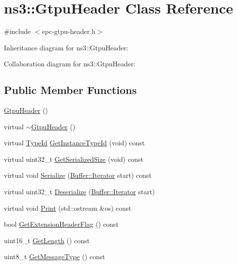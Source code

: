 \hypertarget{classns3_1_1GtpuHeader}{}\section{ns3\+:\+:Gtpu\+Header Class Reference}
\label{classns3_1_1GtpuHeader}


{\ttfamily \#include $<$epc-\/gtpu-\/header.\+h$>$}



Inheritance diagram for ns3\+:\+:Gtpu\+Header\+:


Collaboration diagram for ns3\+:\+:Gtpu\+Header\+:
\subsection*{Public Member Functions}
\begin{DoxyCompactItemize}
\item 
\hyperlink{classns3_1_1GtpuHeader_a6e75cbf6777f9730c92672bdb6f893ee}{Gtpu\+Header} ()
\item 
virtual \hyperlink{classns3_1_1GtpuHeader_a0781addfa1f356dac8d2c037f94a10f1}{$\sim$\+Gtpu\+Header} ()
\item 
virtual \hyperlink{classns3_1_1TypeId}{Type\+Id} \hyperlink{classns3_1_1GtpuHeader_a63741f527db8cbbb4613cfcaa99b3db0}{Get\+Instance\+Type\+Id} (void) const 
\item 
virtual uint32\+\_\+t \hyperlink{classns3_1_1GtpuHeader_a99fc157b75fb69e3a3962a8b2209953a}{Get\+Serialized\+Size} (void) const 
\item 
virtual void \hyperlink{classns3_1_1GtpuHeader_af6005e7d2acb5c6c4014ea507c754617}{Serialize} (\hyperlink{classns3_1_1Buffer_1_1Iterator}{Buffer\+::\+Iterator} start) const 
\item 
virtual uint32\+\_\+t \hyperlink{classns3_1_1GtpuHeader_a596afe8b38ef02b724ea20bd98733c1a}{Deserialize} (\hyperlink{classns3_1_1Buffer_1_1Iterator}{Buffer\+::\+Iterator} start)
\item 
virtual void \hyperlink{classns3_1_1GtpuHeader_a1706c066dde7e895f961832d7fed96bf}{Print} (std\+::ostream \&os) const 
\item 
bool \hyperlink{classns3_1_1GtpuHeader_a0bf3e72a6a25f6810e53ee3af8bd4cf6}{Get\+Extension\+Header\+Flag} () const 
\item 
uint16\+\_\+t \hyperlink{classns3_1_1GtpuHeader_a71a1c2bf85fc7df7536c1ca167df9d72}{Get\+Length} () const 
\item 
uint8\+\_\+t \hyperlink{classns3_1_1GtpuHeader_a75b159941ba6ff976e9928170c25d1e7}{Get\+Message\+Type} () const 

\end{DoxyCompactItemize}
